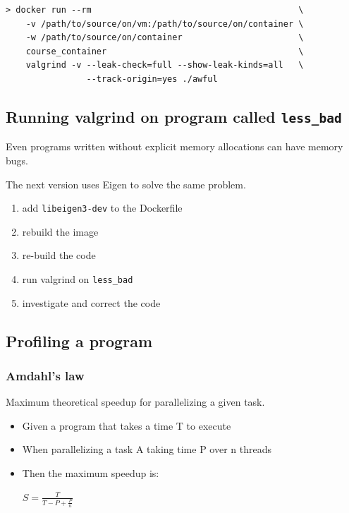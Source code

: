 \begin{verbatim}
> docker run --rm                                         \
    -v /path/to/source/on/vm:/path/to/source/on/container \
    -w /path/to/source/on/container                       \
    course_container                                      \
    valgrind -v --leak-check=full --show-leak-kinds=all   \
                --track-origin=yes ./awful
\end{verbatim}

\subsection{Running valgrind on program called
\texttt{less\_bad}}\label{running-valgrind-on-program-called-lessux5fbad}

Even programs written without explicit memory allocations can have
memory bugs.

The next version uses Eigen to solve the same problem.

\begin{enumerate}
\def\labelenumi{\arabic{enumi}.}
\itemsep1pt\parskip0pt
\item
  add \texttt{libeigen3-dev} to the Dockerfile
\item
  rebuild the image
\item
  re-build the code
\item
  run valgrind on \texttt{less\_bad}
\item
  investigate and correct the code
\end{enumerate}

\subsection{Profiling a program}\label{profiling-a-program}

\subsubsection{Amdahl's law}\label{amdahls-law-1}

Maximum theoretical speedup for parallelizing a given task.

\begin{itemize}
\item
  Given a program that takes a time T to execute
\item
  When parallelizing a task A taking time P over n threads
\item
  Then the maximum speedup is:

  $S = \frac{T}{T - P + \frac{P}{n}}$
\end{itemize}

